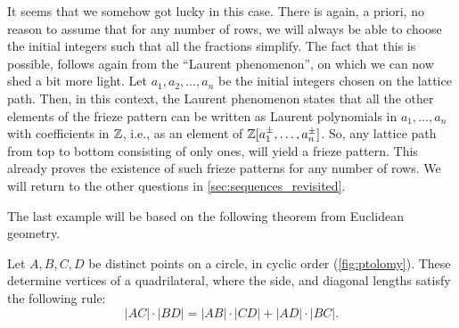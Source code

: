 \begin{example}
	It seems that we somehow got lucky in this case. There is again, a priori, no reason to
	assume that for any number of rows, we will always be able to choose the initial
	integers such that all the fractions simplify. The fact that this is possible, follows
	again from the ``Laurent phenomenon'', on which we can now
	shed a bit more light. Let $a_1, a_2, \dots, a_n$ be the initial integers chosen on the
	lattice path. Then, in this context, the Laurent phenomenon states that all the other
	elements of the frieze pattern can be written as Laurent
	polynomials in $a_1 , \dots, a_n$ with coefficients in
	$\mathbb{Z}$, i.e., as an element of $\mathbb{Z} [a_1 ^\pm, \dots, a_n^\pm]$. So, any lattice path
	from top to bottom consisting of only ones, will yield a frieze pattern. This already
	proves the existence of such frieze patterns for any number of rows. We will return to
	the other questions in \cref{sec:sequences_revisited}.
\end{example}

The last example will be based on the following theorem from Euclidean geometry.
\begin{theorem}\label{thm:ptolomy}

	Let $A,B,C,D$ be distinct points on a circle, in cyclic order (\cref{fig:ptolomy}).
	These determine vertices of a quadrilateral, where the side, and diagonal lengths
	satisfy the following rule:
	\begin{equation*}
		|AC| \cdot |BD| = |AB|\cdot |CD| + |AD| \cdot |BC|.
	\end{equation*}
\end{theorem}


